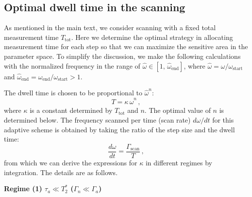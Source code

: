\documentclass{WileyMSP-template}
\begin{document}
	
	\subsection{Optimal dwell time in the scanning}

	As mentioned in the main text, we consider scanning with a fixed total measurement time $T_{\mathrm{tot}}$. 
	Here we determine the optimal strategy in allocating measurement time for each step so that we can maximize the sensitive area in the parameter space. To simplify the discussion, we make the following calculations with the normalized frequency in the range of $\hat{\omega}\in [1,\,\hat{\omega}_{\mathrm{end}}]$, where $\hat{\omega}=\omega/\omega_{\mathrm{start}}$ and $\hat{\omega}_{\mathrm{end}}=\omega_{\mathrm{end}}/\omega_{\mathrm{start}}>1$. %

	The dwell time is chosen to be proportional to $\hat{\omega}^n$:
	\begin{equation}
		T = \kappa\, \hat{\omega}^n
		\,,\label{eq:T_kappa_omega_n}
	\end{equation}
	where $\kappa$ is a constant determined by $T_{\mathrm{tot}}$ and $n$. The optimal value of $n$ is determined below. 
	The frequency scanned per time (scan rate) $d\omega/dt$ for this adaptive scheme is obtained by taking the ratio of the step size and the dwell time: 
	\begin{equation}
		\dfrac{d\omega}{dt} = \dfrac{\Gamma_{\mathrm{scan}}}{T}
		\,,\label{eq:domega_dt}
	\end{equation}
	from which we can derive the expressions for $\kappa$ in different regimes by integration. 
	The details are as follows. 

	
	\textbf{Regime (1) $\tau_a \ll T_2^*$ ($\Gamma_n\ll\Gamma_a$)}
\end{document}
